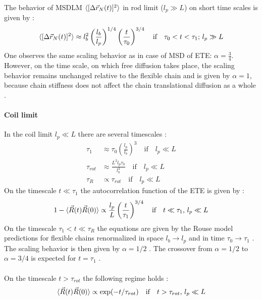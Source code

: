 \documentclass[
    paper=A4,pagesize=automedia,fontsize=12pt,
    BCOR=15mm,DIV=22,
    twoside,headinclude,footinclude=false,
    fleqn,             %
    bibliography=totocnumbered,          %
    listof=totoc,                %
    listof=flat,                 %
    cleardoublepage=empty      %
    numbers=endperiod
]{scrartcl}
\begin{document}
The behavior of MSDLM $\langle[\Delta \vec{r}_N(t)]^2\rangle$
in rod limit ($l_p \gg L$) on short time scales 
is given by \cite{Nikoubashman2016}:
\begin{equation}
    \langle[\Delta \vec{r}_N(t)]^2\rangle \approx l_b^2\left(\frac{l_b}{l_p}\right)^{1/4}\left(\frac{t}{\tau_0}\right)^{3/4} \quad \text{if} \quad \tau_0 < t < \tau_1 \text{; } l_p \gg L
\end{equation}
One observes the same scaling behavior as in case of MSD of ETE: $\alpha=\frac{3}{4}$.
However, on the time scale, on which free diffusion takes place, the scaling
behavior remains unchanged relative to the flexible chain and is given by 
$\alpha=1$, because chain stiffness does not affect the chain translational 
diffusion as a whole \cite{Nikoubashman2016}.
\paragraph{Coil limit}
In the coil limit $l_p \ll L$ there are several timescales \cite{Nikoubashman2016}:
\begin{equation}
    \begin{split}
        \tau_1 & \approx \tau_0 \left(\frac{l_p}{l_b}\right)^3 \quad \text{if} \quad l_p \ll L\\ 
        \tau_{rot} & \approx \frac{L^2 l_p \tau_0}{l_b^3} \quad \text{if} \quad l_p \ll L\\
        \tau_R & \propto \tau_{rot} \quad \text{if} \quad l_p \ll L
    \end{split}
\end{equation}
On the timescale $t \ll \tau_1$ the autocorrelation function of the ETE is given by \cite{Nikoubashman2016}:
\begin{equation}
    1 - \langle\vec{R}(t)\vec{R}(0)\rangle \propto \frac{l_p}{L}\left(\frac{t}{\tau_1}\right)^{3/4} \quad \text{if} \quad t \ll \tau_1 \text{, } l_p \ll L
\end{equation}
On the timescale $\tau_1 < t \ll \tau_R$ the equations are given by the Rouse model
predictions for flexible chains renormalized in space $l_b \rightarrow l_p$ and in time
$\tau_0 \rightarrow \tau_1$ \cite{Nikoubashman2016}. The scaling behavior is then
given by $\alpha=1/2$ \cite{Nikoubashman2016}. The crossover from $\alpha=1/2$ to
$\alpha=3/4$ is expected for $t=\tau_1$ \cite{Nikoubashman2016}.
\\
\\
On the timescale $t > \tau_{rot}$ the following regime holds \cite{Nikoubashman2016}:
\begin{equation} \label{eq:autocorr_ete_coil_limit_long_time}
    \langle\vec{R}(t)\vec{R}(0)\rangle \propto \exp(-t/\tau_{rot}) \quad \text{if} \quad t > \tau_{rot} \text{, } l_p \ll L
\end{equation}
\end{document}
